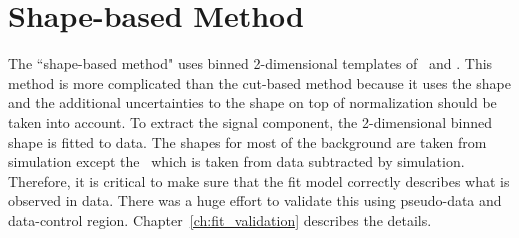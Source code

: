 \section{Shape-based Method}
\label{sec:shape}

The ``shape-based method" uses binned 2-dimensional templates of \mT\ and \mll. 
This method is more complicated than the cut-based method
because it uses the shape and the additional uncertainties to the shape 
on top of normalization should be taken into account. 
To extract the signal component, the 2-dimensional binned shape is fitted to data. 
The shapes for most of the background are taken from simulation except 
the \Wjets\ which is taken from data subtracted by simulation. 
Therefore, it is critical to make sure that the fit model correctly describes 
what is observed in data. There was a huge effort to validate this using 
pseudo-data and data-control region. Chapter~\ref{ch:fit_validation} describes 
the details. 

